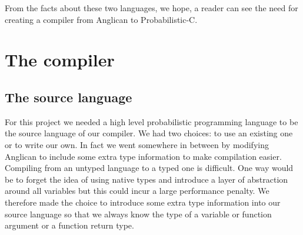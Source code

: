 \documentclass[a4paper]{article}
\begin{document}
From the facts about these two languages, we hope, a reader can see the need for creating a compiler from Anglican to Probabilistic-C.




\section{The compiler}




\subsection{The source language}

For this project we needed a high level probabilistic programming language to be the source language of our compiler. We had two choices: to use an existing one or to write our own. In fact we went somewhere in between by modifying Anglican to include some extra type information to make compilation easier. Compiling from an untyped language to a typed one is difficult. One way would be to forget the idea of using native types and introduce a layer of abstraction around all variables but this could incur a large performance penalty. We therefore made the choice to introduce some extra type information into our source language so that we always know the type of a variable or function argument or a function return type.
\end{document}
